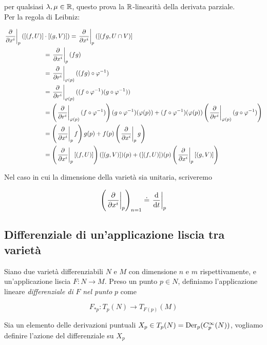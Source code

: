 per qualsiasi $ \lambda,\mu \in \mathbb{R} $, questo prova la $ \mathbb{R} $-linearità della derivata parziale. \\
Per la regola di Leibniz:

\begin{align}
	\begin{split}
		\eval{ \pdv{x^{i}} }_{p} ([(f,U)]& \cdot [(g,V)]) = \eval{ \pdv{x^{i}} }_{p} ([(fg,U \cap V)] \\
		&= \eval{ \pdv{x^{i}} }_{p} (f g) \\
		&= \eval{ \pdv{r^{i}} }_{\varphi(p)} ((f g) \circ \varphi^{-1}) \\
		&= \eval{ \pdv{r^{i}} }_{\varphi(p)} ((f \circ \varphi^{-1}) (g \circ \varphi^{-1})) \\
		&= \left( \eval{ \pdv{r^{i}} }_{\varphi(p)} (f \circ \varphi^{-1}) \right) (g \circ \varphi^{-1})(\varphi(p)) + (f \circ \varphi^{-1})(\varphi(p)) \left( \eval{ \pdv{r^{i}} }_{\varphi(p)} (g \circ \varphi^{-1}) \right) \\
		&= \left( \eval{ \pdv{x^{i}} }_{p} f \right) g(p) + f(p) \left( \eval{ \pdv{x^{i}} }_{p} g \right) \\
		&= \left( \eval{ \pdv{x^{i}} }_{p} [(f,U)] \right) ([(g,V)])(p) + ([(f,U)])(p) \left( \eval{ \pdv{x^{i}} }_{p} [(g,V)] \right)
	\end{split}
\end{align}

Nel caso in cui la dimensione della varietà sia unitaria, scriveremo

\begin{equation}
	\left( \eval{ \pdv{x^{i}} }_{p} \right)_{n=1} \doteq \eval{ \dv{t} }_{p}
\end{equation}

\subsection{Differenziale di un'applicazione liscia tra varietà}

Siano due varietà differenziabili $ N $ e $ M $ con dimensione $ n $ e $ m $ rispettivamente, e un'applicazione liscia $ F : N \to M $. Preso un punto $ p \in N $, definiamo l'applicazione lineare \textit{differenziale di} $ F $ \textit{nel punto} $ p $ come

\begin{equation}
	F_{*p} : T_{p}(N) \to T_{F(p)}(M)
\end{equation}

Sia un elemento delle derivazioni puntuali $ X_{p} \in T_{p}(N) = \operatorname{Der}_{p}(C_{p}^{\infty}(N)) $, vogliamo definire l'azione del differenziale su $ X_{p} $

